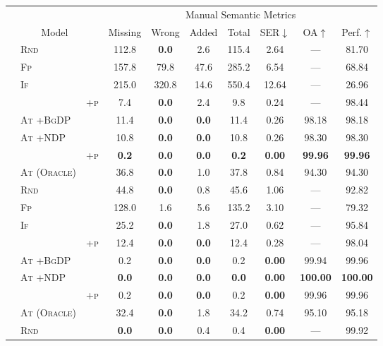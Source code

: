 \begin{table*}[t!]
    \centering

\begin{tabular}{lll c c c c  c c c}
\toprule
 & & &  \multicolumn{7}{c}{Manual Semantic Metrics} \\
\cmidrule(lr){4-10} 
\multicolumn{3}{c}{Model} &  Missing &  Wrong & Added & Total & SER$\downarrow$ & OA$\uparrow$ & Perf.$\uparrow$\\
\midrule
\parbox[t]{2mm}{}
&\textsc{Rnd} & &112.8&\textbf{  0.0}&2.6&115.4&2.64&---&81.70 \\
&\textsc{Fp} & &157.8&79.8&47.6&285.2&6.54&---&68.84 \\
&\textsc{If} & &215.0&320.8&14.6&550.4&12.64&---&26.96 \\
&  & \textsc{+p}&7.4&\textbf{  0.0}&2.4&9.8&0.24&---&98.44 \\
&\textsc{At +BgDP} & &11.4&\textbf{  0.0}&\textbf{  0.0}&11.4&0.26&98.18&98.18 \\
&\textsc{At +NDP} & &10.8&\textbf{  0.0}&\textbf{  0.0}&10.8&0.26&98.30&98.30 \\
&  & \textsc{+p}&\textbf{  0.2}&\textbf{  0.0}&\textbf{  0.0}&\textbf{  0.2}&\textbf{ 0.00}&\textbf{99.96}&\textbf{99.96} \\
&\textsc{At (Oracle)} & &36.8&\textbf{  0.0}&1.0&37.8&0.84&94.30&94.30 \\
\midrule
\parbox[t]{2mm}{}
&\textsc{Rnd} & &44.8&\textbf{  0.0}&0.8&45.6&1.06&---&92.82 \\
&\textsc{Fp} & &128.0&1.6&5.6&135.2&3.10&---&79.32 \\
&\textsc{If} & &25.2&\textbf{  0.0}&1.8&27.0&0.62&---&95.84 \\
&  & \textsc{+p}&12.4&\textbf{  0.0}&\textbf{  0.0}&12.4&0.28&---&98.04 \\
&\textsc{At +BgDP} & &0.2&\textbf{  0.0}&\textbf{  0.0}&0.2&\textbf{ 0.00}&99.94&99.96 \\
&\textsc{At +NDP} & &\textbf{  0.0}&\textbf{  0.0}&\textbf{  0.0}&\textbf{  0.0}&\textbf{ 0.00}&\textbf{100.00}&\textbf{100.00} \\
&  & \textsc{+p}&0.2&\textbf{  0.0}&\textbf{  0.0}&0.2&\textbf{ 0.00}&99.96&99.96 \\
&\textsc{At (Oracle)} & &32.4&\textbf{  0.0}&1.8&34.2&0.74&95.10&95.18 \\
\midrule
\parbox[t]{2mm}{}
&\textsc{Rnd} & &\textbf{  0.0}&\textbf{  0.0}&0.4&0.4&\textbf{ 0.00}&---&99.92 \\

\end{tabular}
\end{table*}

